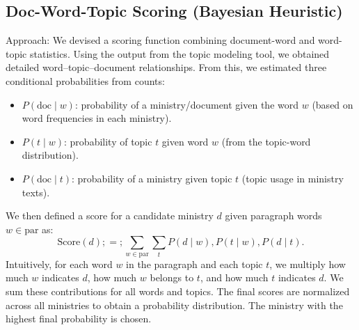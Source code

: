 \documentclass{report}
\begin{document}
\subsection{Doc-Word-Topic Scoring (Bayesian Heuristic)}
Approach: We devised a scoring function combining document-word and word-topic statistics. Using the output from the topic modeling tool, we obtained detailed word–topic–document relationships. From this, we estimated three conditional probabilities from counts:

\begin{itemize}
    \item $P(\text{doc} \mid w)$: probability of a ministry/document given the word $w$ (based on word frequencies in each ministry).
    \item $P(t \mid w)$: probability of topic $t$ given word $w$ (from the topic-word distribution).
    \item $P(\text{doc} \mid t)$: probability of a ministry given topic $t$ (topic usage in ministry texts).
\end{itemize}

We then defined a score for a candidate ministry $d$ given paragraph words $w\in\text{par}$ as:
$$\mathrm{Score}(d) ;=; \sum_{w\in \text{par}} \sum_{t} P(d \mid w),P(t\mid w),P(d\mid t).$$
Intuitively, for each word $w$ in the paragraph and each topic $t$, we multiply how much $w$ indicates $d$, how much $w$ belongs to $t$, and how much $t$ indicates $d$. We sum these contributions for all words and topics. The final scores are normalized across all ministries to obtain a probability distribution. The ministry with the highest final probability is chosen.
\end{document}
